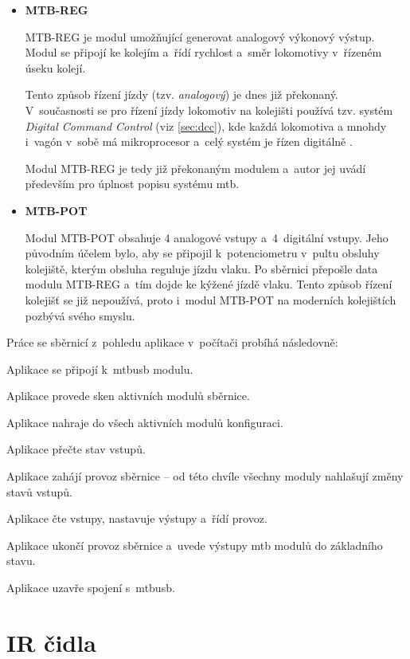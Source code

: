 \begin{itemize}
\item \textbf{MTB-REG}

	MTB-REG je modul umožňující generovat analogový výkonový výstup. Modul se
	připojí ke kolejím a~řídí rychlost a~směr lokomotivy v~řízeném úseku kolejí.

	Tento způsob řízení jízdy (tzv. \textit{analogový}) je dnes již překonaný.
	V~současnosti se pro řízení jízdy lokomotiv na kolejišti používá tzv. systém
	\textit{Digital Command Control} (viz \ref{sec:dcc}), kde každá lokomotiva
	a mnohdy i~vagón v~sobě má mikroprocesor a~celý systém je řízen
	digitálně \cite{dcc_intro:web}.

	Modul MTB-REG je tedy již překonaným modulem a~autor jej uvádí především pro
	úplnost popisu systému \gls{mtb}.

\item \textbf{MTB-POT}

	Modul MTB-POT obsahuje 4 analogové vstupy a~4~digitální vstupy. Jeho
	původním účelem bylo, aby se připojil k~potenciometru v~pultu obsluhy
	kolejiště, kterým obsluha reguluje jízdu vlaku. Po sběrnici přepošle data
	modulu MTB-REG a~tím dojde ke kýžené jízdě vlaku. Tento způsob řízení
	kolejišť se již nepoužívá, proto i~modul MTB-POT na moderních
	kolejištích pozbývá svého smyslu.

\end{itemize}

Práce se sběrnicí z~pohledu aplikace v~počítači probíhá následovně:

\begin{compactenum}
\item Aplikace se připojí k~\gls{mtbusb} modulu.
\item Aplikace provede sken aktivních modulů sběrnice.
\item Aplikace nahraje do všech aktivních modulů konfiguraci.
\item Aplikace přečte stav vstupů.
\item Aplikace zahájí provoz sběrnice – od této chvíle všechny moduly nahlašují
	změny stavů vstupů.
\item Aplikace čte vstupy, nastavuje výstupy a~řídí provoz.
\item Aplikace ukončí provoz sběrnice a~uvede výstupy \gls{mtb} modulů do základního stavu.
\item Aplikace uzavře spojení s~\gls{mtbusb}.
\end{compactenum}


\section{IR čidla} \label{sec:ir}

